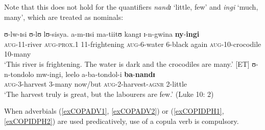 Note that this does not hold for the quantifiers \textit{nandɪ} \lq little, few' and \textit{ingi} \lq much, many', which are treated as nominals:
\begin{exe}
\ex \gll ʊ-lw-ɪsi ʊ-lʊ lʊ-sisya. a-m-ɪɪsi ma-tiitʊ kangɪ ɪ-n-gwina \textbf{ny}-\textbf{ingi}\\
\textsc{aug}-11-river \textsc{aug}-\textsc{prox.1} 11-frightening \textsc{aug}-6-water 6-black again \textsc{aug}-10-crocodile 10-many\\
\glt \lq This river is frightening. The water is dark and the crocodiles are many.' [ET]
\ex \gll ʊ-n-tondolo mw-ingi, leelo a-ba-tondol-i \textbf{ba}-\textbf{nandɪ}\\
\textsc{aug}-3-harvest 3-many now/but \textsc{aug}-2-harvest-\textsc{agnr} 2-little\\
\glt \lq The harvest truly is great, but the labourers are few.' (Luke 10: 2)
\end{exe}

When adverbials (\ref{exCOPADV1}, \ref{exCOPADV2}) or  (\ref{exCOPIDPH1}, \ref{exCOPIDPH2}) are used predicatively, use of a copula verb is compulsory.

\begin{exe}
\ex \label{exCOPADV1}

\begin{xlist}
\end{xlist}
\pagebreak

\ex \label{exCOPADV2} \begin{xlist}

\end{xlist}

\ex \label{exCOPIDPH1} \begin{xlist}

\end{xlist}


\ex \label{exCOPIDPH2} \begin{xlist}
\end{xlist}
\end{exe}
\protect{}

